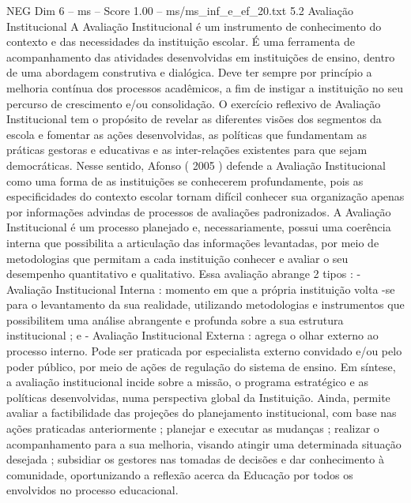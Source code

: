 \begin{textsample}{NEG Dim 6 – ms – Score 1.00 – ms/ms\_inf\_e\_ef\_20.txt}  \label{ex:f6_neg_235}
5.2 Avaliação Institucional A Avaliação Institucional é um instrumento de conhecimento do contexto e das necessidades da instituição escolar.
É uma ferramenta de acompanhamento das atividades desenvolvidas em instituições de ensino, dentro de uma abordagem construtiva e dialógica.
Deve ter sempre por princípio a melhoria contínua dos processos acadêmicos, a fim de instigar a instituição no seu percurso de crescimento e/ou consolidação.
O exercício reflexivo de Avaliação Institucional tem o propósito de revelar as diferentes visões dos segmentos da escola e fomentar as ações desenvolvidas, as políticas que fundamentam as práticas gestoras e educativas e as inter-relações existentes para que sejam democráticas.
Nesse sentido, Afonso ( 2005 ) defende a Avaliação Institucional como uma forma de as instituições se conhecerem profundamente, pois as especificidades do contexto escolar tornam difícil conhecer sua organização apenas por informações advindas de processos de avaliações padronizados.
A Avaliação Institucional é um processo planejado e, necessariamente, possui uma coerência interna que possibilita a articulação das informações levantadas, por meio de metodologias que permitam a cada instituição conhecer e avaliar o seu desempenho quantitativo e qualitativo.
Essa avaliação abrange 2 tipos : - Avaliação Institucional Interna : momento em que a própria instituição volta -se para o levantamento da sua realidade, utilizando metodologias e instrumentos que possibilitem uma análise abrangente e profunda sobre a sua estrutura institucional ; e - Avaliação Institucional Externa : agrega o olhar externo ao processo interno.
Pode ser praticada por especialista externo convidado e/ou pelo poder público, por meio de ações de regulação do sistema de ensino.
Em síntese, a avaliação institucional incide sobre a missão, o programa estratégico e as políticas desenvolvidas, numa perspectiva global da Instituição.
Ainda, permite avaliar a factibilidade das projeções do planejamento institucional, com base nas ações praticadas anteriormente ; planejar e executar as mudanças ; realizar o acompanhamento para a sua melhoria, visando atingir uma determinada situação desejada ; subsidiar os gestores nas tomadas de decisões e dar conhecimento à comunidade, oportunizando a reflexão acerca da Educação por todos os envolvidos no processo educacional.

\end{textsample}
